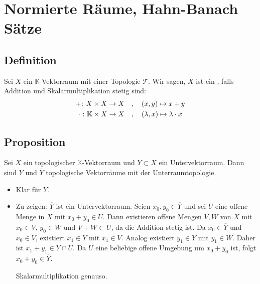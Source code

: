 \section{Normierte Räume, Hahn-Banach Sätze} %
\label{sec:2}

\subsection[Definition: Topologischer Vektorraum]{Definition} %
\label{sub:21}
Sei $X$ ein $\mathds{K}$-Vektorraum mit einer Topologie $\mathcal{T}$. Wir sagen, $X$ ist ein , falls Addition und Skalarmultiplikation stetig sind:
\begin{align*}
	+ \colon X \times X  \to X \quad &, \quad(x,y) \mapsto x+y \\
	\makebox[\widthof{$+$}]{$\cdot$} \colon \mathds{K} \times X \to X \quad &, \quad (\lambda ,x) \mapsto \lambda \cdot x
\end{align*}

\subsection[Proposition: Unterräume topologischer Vektorräume sind topologische Vektorräume]{Proposition} %
\label{sub:22}
Sei $X$ ein topologischer $\mathds{K}$-Vektorraum und $Y \subset X$ ein Untervektorraum. Dann sind $Y$ und $\overline{Y}$ topologische Vektorräume mit der Unterraumtopologie.
\begin{itemize}
	\item Klar für $Y$.
	\item Zu zeigen: $\overline{Y}$ ist ein Untervektorraum. Seien $x_0, y_0 \in \overline{Y}$ und sei $U$ eine offene Menge in $X$ mit $x_0 + y_0 \in U$. Dann existieren
	offene Mengen $V,W$ von $X$ mit $x_0 \in V$, $y_0 \in W$ und $V+W \subset U$, da die Addition stetig ist. Da $x_0 \in \overline{Y}$ und $x_0 \in V$, existiert 
	$x_1 \in Y$ mit $x_1 \in V$. Analog existiert $y_1 \in Y$ mit $y_1 \in W$. Daher ist $x_1 + y_1 \in Y \cap U$. Da $U$ eine beliebige offene Umgebung um $x_0+ y_0$ ist,
	folgt $x_0 +y_0 \in \overline{Y}$.
	
	Skalarmultiplikation genauso. \bewende
\end{itemize}

